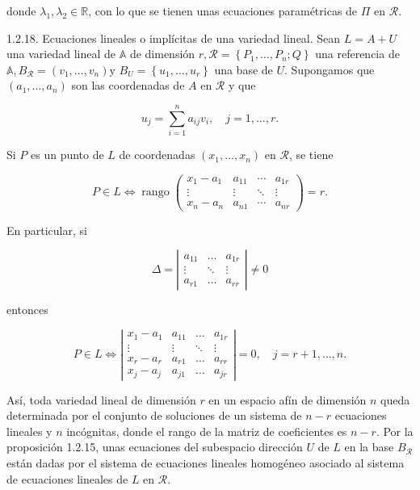 \documentclass[12pt, a4paper, ones, notitlepage, openany,titlepage]{article}
\begin{document}
donde $\lambda_{1}, \lambda_{2} \in \mathbb{R}$, con lo que se tienen unas ecuaciones paramétricas de $\Pi$ en $\mathcal{R}$.

1.2.18. Ecuaciones lineales o implícitas de una variedad lineal. Sean $L=A+U$ una variedad lineal de $\mathbb{A}$ de dimensión $r, \mathcal{R}=\left\{P_{1}, \ldots, P_{n} ; Q\right\}$ una referencia de $\mathbb{A}, B_{\mathcal{R}}=\left(v_{1}, \ldots, v_{n}\right) \mathrm{y}$ $B_{U}=\left\{u_{1}, \ldots, u_{r}\right\}$ una base de $U$. Supongamos que $\left(a_{1}, \ldots, a_{n}\right)$ son las coordenadas de $A$ en $\mathcal{R}$ y que

$$
u_{j}=\sum_{i=1}^{n} a_{i j} v_{i}, \quad j=1, \ldots, r .
$$

Si $P$ es un punto de $L$ de coordenadas $\left(x_{1}, \ldots, x_{n}\right)$ en $\mathcal{R}$, se tiene

$$
P \in L \Longleftrightarrow \operatorname{rango}\left(\begin{array}{cccc}
x_{1}-a_{1} & a_{11} & \cdots & a_{1 r} \\
\vdots & \vdots & \ddots & \vdots \\
x_{n}-a_{n} & a_{n 1} & \cdots & a_{n r}
\end{array}\right)=r .
$$

En particular, si

$$
\Delta=\left|\begin{array}{ccc}
a_{11} & \ldots & a_{1 r} \\
\vdots & \ddots & \vdots \\
a_{r 1} & \ldots & a_{r r}
\end{array}\right| \neq 0
$$

entonces

$$
P \in L \Longleftrightarrow\left|\begin{array}{rrrr}
x_{1}-a_{1} & a_{11} & \ldots & a_{1 r} \\
\vdots & \vdots & \ddots & \vdots \\
x_{r}-a_{r} & a_{r 1} & \ldots & a_{r r} \\
x_{j}-a_{j} & a_{j 1} & \ldots & a_{j r}
\end{array}\right|=0, \quad j=r+1, \ldots, n .
$$

Así, toda variedad lineal de dimensión $r$ en un espacio afín de dimensión $n$ queda determinada por el conjunto de soluciones de un sistema de $n-r$ ecuaciones lineales y $n$ incógnitas, donde el rango de la matriz de coeficientes es $n-r$. Por la proposición 1.2.15, unas ecuaciones del subespacio dirección $U$ de $L$ en la base $B_{\mathcal{R}}$ están dadas por el sistema de ecuaciones lineales homogéneo asociado al sistema de ecuaciones lineales de $L$ en $\mathcal{R}$.
\end{document}
